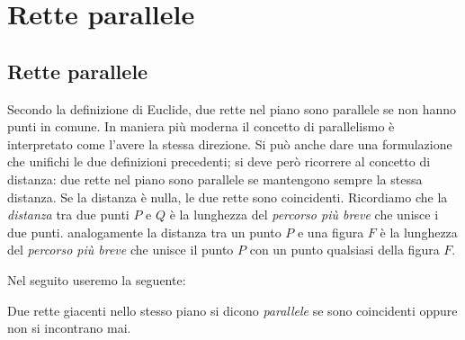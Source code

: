 
\chapter{Rette parallele}
\label{chap:rette_parallele}


\section{Rette parallele}\label{sect:rette_parallele}

Secondo la definizione di Euclide, due rette nel piano sono parallele 
se non hanno punti in comune.
In maniera più moderna il concetto di parallelismo è interpretato 
come l'avere la stessa direzione.
Si può anche dare una formulazione che unifichi le due definizioni 
precedenti; si deve però ricorrere al concetto di distanza: due rette 
nel piano sono parallele se mantengono sempre la stessa distanza. Se 
la distanza è nulla, le due rette sono coincidenti.
Ricordiamo che la \emph{distanza} tra due punti $P$ e $Q$ è 
la lunghezza del \emph{percorso più breve} che unisce i due punti. 
analogamente la distanza tra un punto $P$ e una figura $F$ è 
la lunghezza del \emph{percorso più breve} che unisce il punto $P$ 
con un punto qualsiasi della figura $F$.

Nel seguito useremo la seguente:
\begin{definizione}
  Due rette giacenti nello stesso piano si dicono \emph{parallele} se 
  sono coincidenti oppure non si incontrano mai.
\end{definizione}

